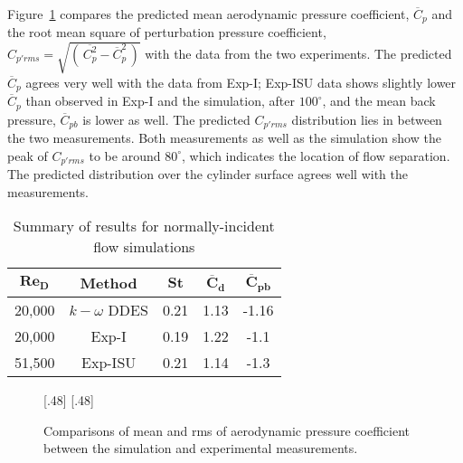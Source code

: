 Figure~\ref{fig:Cp_compared_Re20k} compares the predicted mean aerodynamic
pressure coefficient, $\overline{C}_p$ and the root mean square of perturbation
pressure coefficient, $C_{p'rms} = \sqrt{(\,\overline{C^2_p} -
\overline{C}^2_p\,)}$ with the data from the two experiments. The predicted
$\overline{C}_p$ agrees very well with the data from Exp-I; Exp-ISU data shows
slightly lower $\overline{C}_p$ than observed in Exp-I and the simulation,
after $100^\circ$, and the mean back pressure, $\overline{C}_{pb}$ is lower as
well. The predicted $C_{p'rms}$ distribution lies in between the two
measurements. Both measurements as well as the simulation show the peak of
$C_{p'rms}$ to be around $80^\circ$, which indicates the location of flow
separation. The predicted distribution over the cylinder surface agrees well
with the measurements.
%
\begin{table}[htb!]
  \caption{Summary of results for normally-incident flow simulations} 
  \label{tab:comparisonRe20k} 
  \begin{center}
  \begin{tabular}{c|c|c|c|c}
      $\boldsymbol{Re_D}$ & \textbf{Method} & $\boldsymbol{St}$ & $\boldsymbol{\overline{C}_d}$ & $\boldsymbol{\overline{C}_{pb}}$ \\ \hline
      \hline
      20,000 & $k-\omega$ DDES & 0.21 & 1.13 & -1.16 \\ \hline
      20,000 & Exp-I    & 0.19 & 1.22 & -1.1  \\ \hline
      51,500 & Exp-ISU         & 0.21 & 1.14 & -1.3  \\ \hline
      \hline
  \end{tabular}
  \end{center}
\end {table}

\begin{figure}[htb!]
  \centering
    [.48\linewidth]{}
  \hspace*{\fill}
    [.48\linewidth]{}
  \caption{Comparisons of mean and rms of aerodynamic pressure coefficient
  between the simulation and experimental measurements.}
  \label{fig:Cp_compared_Re20k}
\end{figure}

